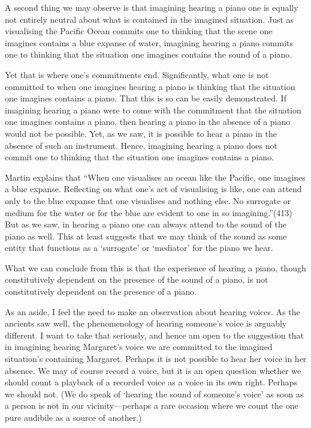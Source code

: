 \documentclass[sloppy, journal, git, bytitle, dodraft]{humapap}
\begin{document}
A second thing we may observe is that imagining hearing a piano one is equally not entirely neutral about what is contained in the imagined situation. Just as visualising the Pacific Ocean commits one to thinking that the scene one imagines contains a blue expanse of water, imagining hearing a piano commits one to thinking that the situation one imagines contains the sound of a piano.

Yet that is where one's commitments end. Significantly, what one is not committed to when one imagines hearing a piano is thinking that the situation one imagines contains a piano. That this is so can be easily demonstrated. If imagining hearing a piano were to come with the commitment that the situation one imagines contains a piano, then hearing a piano in the absence of a piano would not be possible. Yet, as we saw, it is possible to hear a piano in the absence of such an instrument. Hence, imagining hearing a piano does not commit one to thinking that the situation one imagines contains a piano.

Martin explains that ``When one visualises an ocean like the Pacific, one imagines a blue expanse. Reflecting on what one’s act of visualising is like, one can attend only to the blue expanse that one visualises and nothing else. No surrogate or medium for the water or for the blue are evident to one in so imagining.''(413) But as we saw, in hearing a piano one can always attend to the sound of the piano as well. This at least suggests that we may think of the sound as some entity that functions as a `surrogate' or `mediator' for the piano we hear. 

What we can conclude from this is that the experience of hearing a piano, though constitutively dependent on the presence of the sound of a piano, is not constitutively dependent on the presence of a piano. 

\sect As an aside, I feel the need to make an observation about hearing voices. As the ancients saw well, the phenomenology of hearing someone's voice is arguably different. I want to take that seriously, and hence am open to the suggestion that in imagining hearing Margaret's voice we are committed to the imagined situation's containing Margaret. Perhaps it is not possible to hear her voice in her absence. We may of course record a voice, but it is an open question whether we should count a playback of a recorded voice as a voice in its own right. Perhaps we should not. (We do speak of `hearing the sound of someone's voice' as soon as a person is not in our vicinity---perhaps a rare occasion where we count the one pure audibile as a source of another.) 
\end{document}
